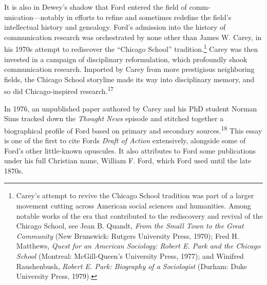 \documentclass[openany,nobib]{tufte-book}
\begin{document}
It is also in Dewey's shadow that Ford entered the field of
comm-\\\noindent unication---notably in efforts to refine and sometimes redefine the
field's intellectual history and genealogy. Ford's admission into the
history of communication research was orchestrated by none other than
James W. Carey, in his 1970s attempt to rediscover the ``Chicago
School'' tradition.\footnote{Carey's attempt to revive the Chicago
  School tradition was part of a larger movement cutting across American
  social sciences and humanities. Among notable works of the era that
  contributed to the rediscovery and revival of the Chicago School, see
  Jean B. Quandt, \emph{From the Small Town to the Great Community} (New
  Brunswick: Rutgers University Press, 1970); Fred H. Matthews,
  \emph{Quest for an American Sociology: Robert E. Park and the Chicago
  School} (Montreal: McGill-Queen's University Press, 1977); and
  Winifred Raushenbush, \emph{Robert E. Park: Biography of a
  Sociologist} (Durham: Duke University Press, 1979).} Carey was then
invested in a campaign of disciplinary reformulation, which profoundly
shook communication research. Imported by Carey from more prestigious
neighboring fields, the Chicago School storyline made its way into
disciplinary memory, and so did Chicago-inspired research.\textsuperscript{17}

In 1976, an unpublished paper authored by Carey and his PhD student
Norman Sims tracked down the \emph{Thought News} episode and stitched
together a biographical profile of Ford based on primary and secondary
sources.\textsuperscript{18} This essay is
one of the first to cite Ford\textquotesingle s \emph{Draft of Action}
extensively, alongside some of Ford's other little-known opuscules. It
also attributes to Ford some publications under his full Christian name,
William F. Ford, which Ford used until the late 1870s.
\end{document}
